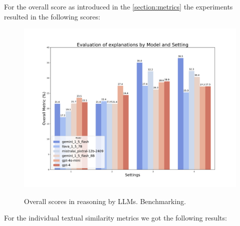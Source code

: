 \documentclass{article}
\begin{document}
For the overall score as introduced in the \ref{section:metrics} the experiments resulted in the following scores:
\begin{figure} [H]
    \centering
    \includegraphics[width=1\linewidth]{overall_metrics.pdf}
    \label{fig:benchmark_overall}
    \caption{Overall scores in reasoning by LLMs. Benchmarking.}
\end{figure}
For the individual textual similarity metrics we got the following results:
\end{document}
